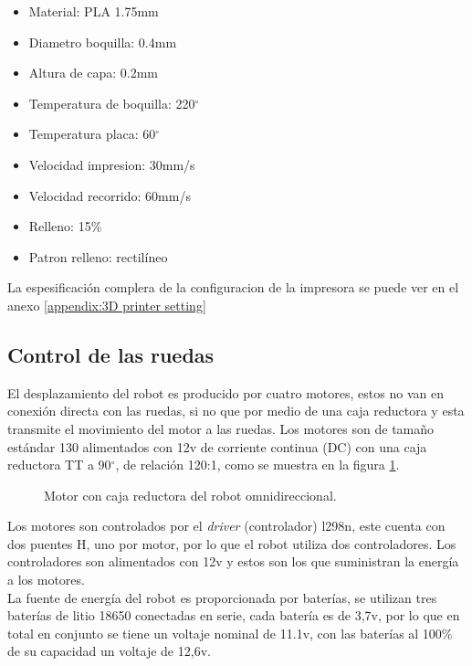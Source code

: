 \documentclass{iccmemoria}
\begin{document}
\begin{itemize}
	\item Material: PLA 1.75mm
	\item Diametro boquilla: 0.4mm
	\item Altura de capa: 0.2mm
	\item Temperatura de boquilla: 220$^{\circ}$
	\item Temperatura placa: 60$^{\circ}$
	\item Velocidad impresion: 30mm/s
	\item Velocidad recorrido: 60mm/s
	\item Relleno: 15\%
	\item Patron relleno: rectilíneo
\end{itemize}

La espesificación complera de la configuracion de la impresora se puede ver en el anexo \ref{appendix:3D printer setting}

\subsection{Control de las ruedas}

El desplazamiento del robot es producido por cuatro motores, estos no van en conexión directa con las ruedas, si no que por medio de una caja reductora y esta transmite el movimiento del motor a las ruedas. Los motores son de tamaño estándar 130 alimentados con 12v de corriente continua (DC) con una caja reductora TT a 90$^{\circ}$, de relación 120:1, como se muestra en la figura \ref{fig:motor}.\\

\begin{figure}[H]
  \centering
  
  \caption[Motor con caja reductora del robot omnidireccional.]{Motor con caja reductora del robot omnidireccional.}
  \label{fig:motor}
\end{figure}

Los motores son controlados por el \emph{driver} (controlador) l298n, este cuenta con dos puentes H, uno por motor, por lo que el robot utiliza dos controladores. Los controladores son alimentados con 12v y estos son los que suministran la energía a los motores.\\

La fuente de energía del robot es proporcionada por baterías, se utilizan tres baterías de litio 18650 conectadas en serie, cada batería es de 3,7v, por lo que en total en conjunto se tiene un voltaje nominal de 11.1v, con las baterías al 100\% de su capacidad un voltaje de 12,6v.\\
\end{document}
